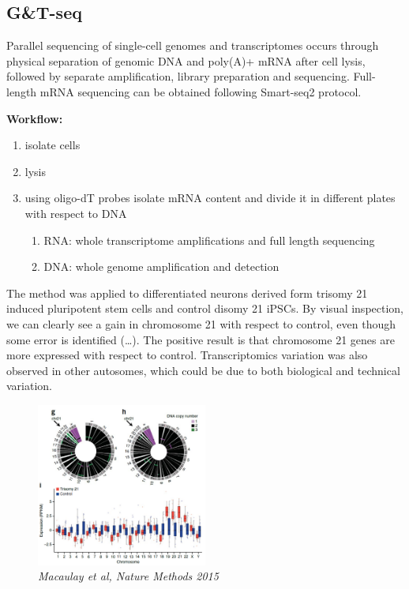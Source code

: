 \hypertarget{gt-seq}{%
\subsection{G\&T-seq}\label{gt-seq}}

Parallel sequencing of single-cell genomes and transcriptomes occurs
through physical separation of genomic DNA and poly(A)+ mRNA after cell
lysis, followed by separate amplification, library preparation and
sequencing. Full-length mRNA sequencing can be obtained following
Smart-seq2 protocol.

\textbf{Workflow:}

\begin{enumerate}
\def\labelenumi{\arabic{enumi}.}
\tightlist
\item
  isolate cells
\item
  lysis
\item
  using oligo-dT probes isolate mRNA content and divide it in different
  plates with respect to DNA

  \begin{enumerate}
  \def\labelenumii{\arabic{enumii}.}
  \tightlist
  \item
    RNA: whole transcriptome amplifications and full length sequencing
  \item
    DNA: whole genome amplification and detection
  \end{enumerate}
\end{enumerate}

The method was applied to differentiated neurons derived form trisomy 21
induced pluripotent stem cells and control disomy 21 iPSCs. By visual
inspection, we can clearly see a gain in chromosome 21 with respect to
control, even though some error is identified (\ldots). The positive
result is that chromosome 21 genes are more expressed with respect to
control. Transcriptomics variation was also observed in other autosomes,
which could be due to both biological and technical variation.

\begin{figure}
\centering
\includegraphics[width=0.5\textwidth]{images/Screenshot_3.png}
\caption{\emph{Macaulay et al, Nature Methods 2015}}
\end{figure}


